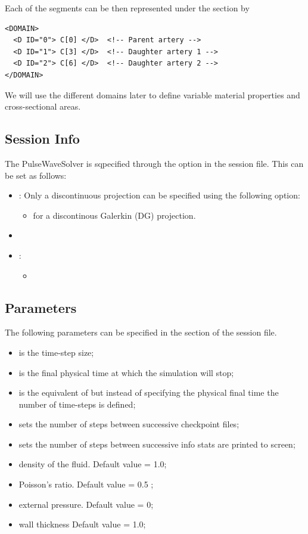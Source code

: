 Each of the segments can be then represented under the section  by
\begin{lstlisting}[style=XmlStyle]
<DOMAIN> 
  <D ID="0"> C[0] </D>	<!-- Parent artery -->
  <D ID="1"> C[3] </D>	<!-- Daughter artery 1 -->
  <D ID="2"> C[6] </D>	<!-- Daughter artery 2 -->
</DOMAIN>
\end{lstlisting}

We will use the different domains later to define variable material properties and cross-sectional areas.

\subsection{Session Info}
The PulseWaveSolver is sqpecified through the 
option in the session file. This can be set as follows:
\begin{itemize}
\item {}: Only a discontinuous projection can be specified
using the following option:
    \begin{itemize}
    \item {} for a discontinous Galerkin (DG) projection.
    \end{itemize}
\item {}
\item {}:
    \begin{itemize}
    \item {}
    \end{itemize}
\end{itemize}

 \subsection{Parameters}
The following parameters can be specified in the  section of
the session file. 
\begin{itemize}
\item {} is the time-step size;
\item {} is the final physical time at which the simulation will  stop;
\item {} is the equivalent of  but instead of specifying the 
physical final time the number of time-steps is defined;
\item {} sets the number of steps between successive checkpoint files;
\item {} sets the number of steps between successive info stats are printed 
to screen;
\item {} density of the fluid. Default value = 1.0;
\item {} Poisson's ratio. Default value = 0.5 ;
\item {} external pressure. Default value = 0;
\item {} wall thickness Default value = 1.0;
\end{itemize}

